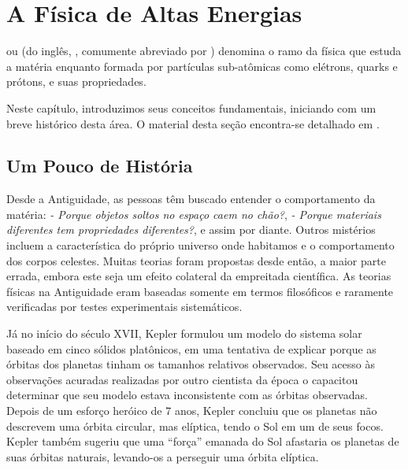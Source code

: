 \typeout{ ====================================================================}
\typeout{ ====================================================================}

\chapter{A Física de Altas Energias}
\label{chap:introducao}

 ou  (do inglês,
, comumente abreviado por ) denomina o
ramo da física que estuda a matéria enquanto formada por partículas
sub-atômicas como elétrons, quarks e prótons, e suas propriedades.

Neste capítulo, introduzimos seus conceitos fundamentais, iniciando com um
breve histórico desta área. O material desta seção encontra-se detalhado em
\cite{partadv}.


\section{Um Pouco de História}

Desde a Antiguidade, as pessoas têm buscado entender o comportamento da
matéria: \textit{- Porque objetos soltos no espaço caem no chão?}, \textit{-
Porque materiais diferentes tem propriedades diferentes?}, e assim por
diante. Outros mistérios incluem a característica do próprio universo onde
habitamos e o comportamento dos corpos celestes. Muitas teorias foram
propostas desde então, a maior parte errada, embora este seja um efeito
colateral da empreitada científica. As teorias físicas na Antiguidade eram
baseadas somente em termos filosóficos e raramente verificadas por testes
experimentais sistemáticos.

Já no início do século XVII, Kepler formulou um modelo do sistema solar
baseado em cinco sólidos platônicos, em uma tentativa de explicar porque as
órbitas dos planetas tinham os tamanhos relativos observados. Seu acesso às
observações acuradas realizadas por outro cientista da época o capacitou
determinar que seu modelo estava inconsistente com as órbitas
observadas. Depois de um esforço heróico de 7 anos, Kepler concluiu que os
planetas não descrevem uma órbita circular, mas elíptica, tendo o Sol em um de
seus focos. Kepler também sugeriu que uma ``força'' emanada do Sol afastaria
os planetas de suas órbitas naturais, levando-os a perseguir uma órbita
elíptica.

